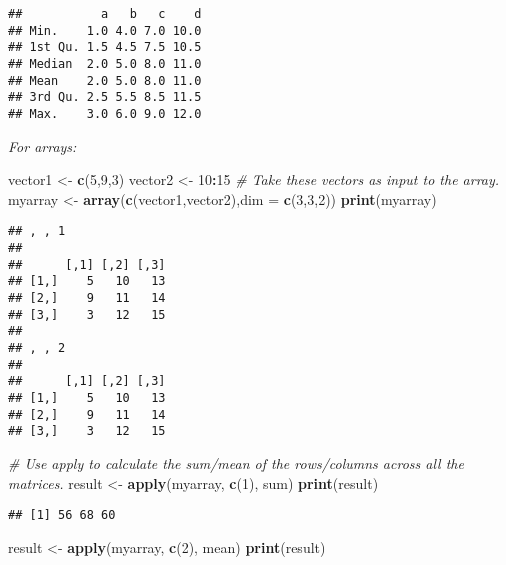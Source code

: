 \documentclass[]{book}
\newenvironment{Shaded}{\begin{snugshade}}{\end{snugshade}}
\newcommand{\KeywordTok}[1]{\textcolor[rgb]{0.13,0.29,0.53}{\textbf{#1}}}
\newcommand{\DataTypeTok}[1]{\textcolor[rgb]{0.13,0.29,0.53}{#1}}
\newcommand{\DecValTok}[1]{\textcolor[rgb]{0.00,0.00,0.81}{#1}}
\newcommand{\StringTok}[1]{\textcolor[rgb]{0.31,0.60,0.02}{#1}}
\newcommand{\CommentTok}[1]{\textcolor[rgb]{0.56,0.35,0.01}{\textit{#1}}}
\newcommand{\OperatorTok}[1]{\textcolor[rgb]{0.81,0.36,0.00}{\textbf{#1}}}
\newcommand{\NormalTok}[1]{#1}
\theoremstyle{definition}
\theoremstyle{definition}
\theoremstyle{definition}
\theoremstyle{remark}
\begin{document}
\begin{verbatim}
##           a   b   c    d
## Min.    1.0 4.0 7.0 10.0
## 1st Qu. 1.5 4.5 7.5 10.5
## Median  2.0 5.0 8.0 11.0
## Mean    2.0 5.0 8.0 11.0
## 3rd Qu. 2.5 5.5 8.5 11.5
## Max.    3.0 6.0 9.0 12.0
\end{verbatim}

\emph{For arrays:}

\begin{Shaded}
\begin{Highlighting}[]
\NormalTok{vector1 <-}\StringTok{ }\KeywordTok{c}\NormalTok{(}\DecValTok{5}\NormalTok{,}\DecValTok{9}\NormalTok{,}\DecValTok{3}\NormalTok{)}
\NormalTok{vector2 <-}\StringTok{ }\DecValTok{10}\OperatorTok{:}\DecValTok{15}
\CommentTok{# Take these vectors as input to the array.}
\NormalTok{myarray <-}\StringTok{ }\KeywordTok{array}\NormalTok{(}\KeywordTok{c}\NormalTok{(vector1,vector2),}\DataTypeTok{dim =} \KeywordTok{c}\NormalTok{(}\DecValTok{3}\NormalTok{,}\DecValTok{3}\NormalTok{,}\DecValTok{2}\NormalTok{))}
\KeywordTok{print}\NormalTok{(myarray)}
\end{Highlighting}
\end{Shaded}

\begin{verbatim}
## , , 1
## 
##      [,1] [,2] [,3]
## [1,]    5   10   13
## [2,]    9   11   14
## [3,]    3   12   15
## 
## , , 2
## 
##      [,1] [,2] [,3]
## [1,]    5   10   13
## [2,]    9   11   14
## [3,]    3   12   15
\end{verbatim}

\begin{Shaded}
\begin{Highlighting}[]
\CommentTok{# Use apply to calculate the sum/mean of the rows/columns across all the matrices.}
\NormalTok{result <-}\StringTok{ }\KeywordTok{apply}\NormalTok{(myarray, }\KeywordTok{c}\NormalTok{(}\DecValTok{1}\NormalTok{), sum)}
\KeywordTok{print}\NormalTok{(result)}
\end{Highlighting}
\end{Shaded}

\begin{verbatim}
## [1] 56 68 60
\end{verbatim}

\begin{Shaded}
\begin{Highlighting}[]
\NormalTok{result <-}\StringTok{ }\KeywordTok{apply}\NormalTok{(myarray, }\KeywordTok{c}\NormalTok{(}\DecValTok{2}\NormalTok{), mean)}
\KeywordTok{print}\NormalTok{(result)}
\end{Highlighting}
\end{Shaded}
\end{document}
